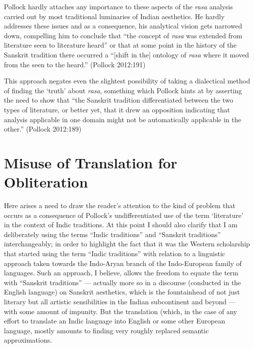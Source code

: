 Pollock hardly attaches any importance to these aspects of the \textsl{rasa} analysis carried out by most traditional luminaries of Indian aesthetics. He hardly addresses these issues and as a consequence, his analytical vision gets narrowed down, compelling him to conclude that “the concept of \textsl{rasa} was extended from literature seen to literature heard” or that at some point in the history of the Sanskrit tradition there occurred a “[shift in the] ontology of \textsl{rasa} where it moved from the seen to the heard.” (Pollock 2012:191) 

This approach negates even the slightest possibility of taking a dialectical method of finding the ‘truth’ about \textsl{rasa}, something which Pollock hints at by asserting the need to show that “the Sanskrit tradition differentiated between the two types of literature, or better yet, that it drew an opposition indicating that analysis applicable in one domain might not be automatically applicable in the other.” (Pollock 2012:189)\\[-21pt]

\section*{Misuse of Translation for Obliteration}

Here arises a need to draw the reader’s attention to the kind of problem that occurs as a consequence of Pollock’s undifferentiated use of the term ‘literature’ in the context of Indic traditions. At this point I should also clarify that I am deliberately using the terms “Indic traditions” and “Sanskrit traditions” interchangeably; in order to highlight the fact that it was the Western scholarship that started using the term “Indic traditions” with relation to a linguistic approach taken towards the Indo-Aryan branch of the Indo-European family of languages. Such an approach, I believe, allows the freedom to equate the term with “Sanskrit traditions” --- actually more so in a discourse (conducted in the English language) on Sanskrit aesthetics, which is the fountainhead of not just literary but all artistic sensibilities in the Indian subcontinent and beyond --- with some amount of impunity. But the translation (which, in the case of any effort to translate an Indic language into English or some other European language, mostly amounts to finding very roughly replaced semantic approximations. 

